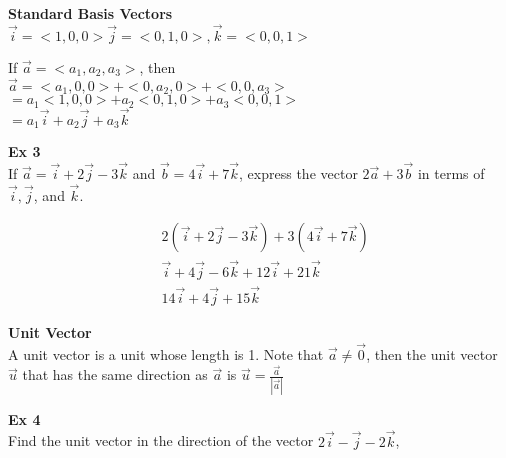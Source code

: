 \documentclass{article}
\begin{document}
  \textbf{Standard Basis Vectors}\\
  $ \vec{i} = <1, 0, 0 > \vec{j}= <0, 1, 0>, \vec{k}= <0,0,1>$

  If $ \vec{a} = <a_1, a_2, a_3> $, then\\
  $ \vec{a}= <a_1, 0, 0> + <0, a_2, 0> + <0, 0, a_3> $\\
  $= a_1 <1, 0, 0> + a_2 <0, 1, 0> + a_3 <0, 0, 1>  $\\
  $ = a_1 \vec{i} + a_2 \vec{j} + a_3 \vec{k} $

  \textbf{Ex 3}\\
  If $ \vec{a} = \vec{i} +2 \vec{j} -3 \vec{k} $ and $ \vec{b} = 4 \vec{i} + 7 \vec{k} $, express the vector $ 2 \vec{a} + 3 \vec{b} $ in terms of $ \vec{i}, \vec{j} $, and $ \vec{k} $.

  \[
    \begin{aligned}
    & 2( \vec{i} + 2 \vec{j} - 3 \vec{k}) + 3( 4 \vec{i} + 7 \vec{k})\\
    & \vec{i} + 4 \vec{j} - 6 \vec{k} + 12 \vec{i} + 21 \vec{k}\\
    & \boxed{14 \vec{i} + 4 \vec{j} + 15 \vec{k}}
    \end{aligned}
  \]


  \textbf{Unit Vector}\\
  A unit vector is a unit whose length is 1. Note that $ \vec{a} \neq \vec{0} $, then the unit vector $ \vec{u} $ that has the same direction as $ \vec{a} $ is $ \vec{u}= \frac{ \vec{a}}{| \vec{a}|} $

  \textbf{Ex 4}\\
  Find the unit vector in the direction of the vector $  2 \vec{i} - \vec{j} - 2 \vec{k} $, 
\end{document}

